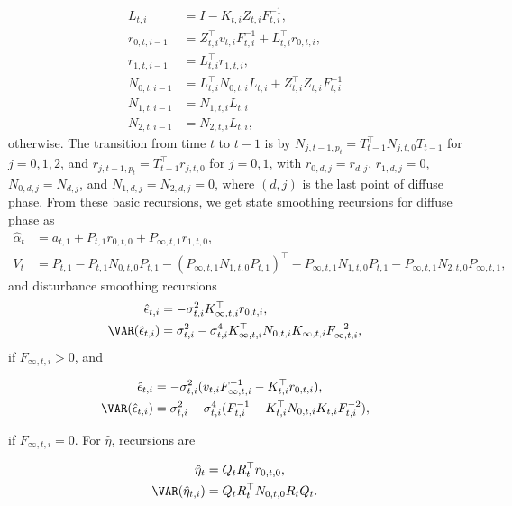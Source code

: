 \documentclass[nojss,article]{jss}\usepackage[]{graphicx}\usepackage[]{color}
\begin{document}
\begin{equation*} 
\begin{aligned}
L_{t,i} &= I - K_{t,i}Z_{t,i}F_{t,i}^{-1},\\
r_{0,t,i-1} &= Z_{t,i}^\top v_{t,i}F_{t,i}^{-1} + L_{t,i}^\top r_{0,t,i}, \\
r_{1,t,i-1} &= L_{t,i}^\top r_{1,t,i}, \\
N_{0,t,i-1} &= L_{t,i}^\top N_{0,t,i}L_{t,i}+Z_{t,i}^\top Z_{t,i}F_{t,i}^{-1}\\
N_{1,t,i-1} &= N_{1,t,i}L_{t,i}\\
N_{2,t,i-1} &= N_{2,t,i}L_{t,i},
\end{aligned} 
\end{equation*}
otherwise. The transition from time $t$ to $t-1$ is by $N_{j,t-1,p_t} =
T_{t-1}^\top N_{j,t,0}T_{t-1}$ for $j=0,1,2$, and $r_{j,t-1,p_t} = T_{t-1}^\top r_{j,t,0}$
for $j=0,1$, with $r_{0,d,j}=r_{d,j}$, $r_{1,d,j}=0$, $N_{0,d,j}=N_{d,j}$, and
$N_{1,d,j}=N_{2,d,j}=0$, where $(d,j)$ is the last point of diffuse phase.
From these basic recursions, we get state smoothing recursions for diffuse phase
as
\begin{equation*} 
\begin{aligned}
\hat\alpha_{t} &= a_{t,1} + P_{t,1}r_{0,t,0} + P_{\infty,t,1}r_{1,t,0},\\
V_{t} &= P_{t,1}-P_{t,1}N_{0,t,0}P_{t,1} -(P_{\infty,t,1}N_{1,t,0}P_{t,1})^\top
-P_{\infty,t,1}N_{1,t,0}P_{t,1} - P_{\infty,t,1}N_{2,t,0}P_{\infty,t,1},
\end{aligned}
\end{equation*} 
and disturbance smoothing recursions
\begin{equation*} 
\begin{aligned}
\hat \epsilon_{t,i} &= -\sigma^2_{t,i}K_{\infty,t,i}^\top r_{0,t,i},\\
\VAR(\hat \epsilon_{t,i}) &= \sigma^2_{t,i} -
\sigma^4_{t,i}K_{\infty,t,i}^\top N_{0,t,i}K_{\infty,t,i}F_{\infty,t,i}^{-2},
\end{aligned} 
\end{equation*}
if $F_{\infty,t,i}>0$, and

\begin{equation*} 
\begin{aligned}
\hat \epsilon_{t,i} &=
-\sigma^2_{t,i}(v_{t,i}F_{\infty,t,i}^{-1}-K_{t,i}^\top r_{0,t,i}),\\
\VAR(\hat \epsilon_{t,i}) &= \sigma^2_{t,i} -
\sigma^4_{t,i}(F_{t,i}^{-1}-K_{t,i}^\top N_{0,t,i}K_{t,i}F_{t,i}^{-2}),
\end{aligned}
\end{equation*}

if $F_{\infty,t,i}=0$. For $\hat\eta$, recursions are

\begin{equation*} 
\begin{aligned}
\hat \eta_{t} &= Q_tR_t^\top r_{0,t,0},\\
\VAR(\hat \eta_{t,i}) &= Q_tR_t^\top N_{0,t,0}R_tQ_t.
\end{aligned} 
\end{equation*}




\end{document}
